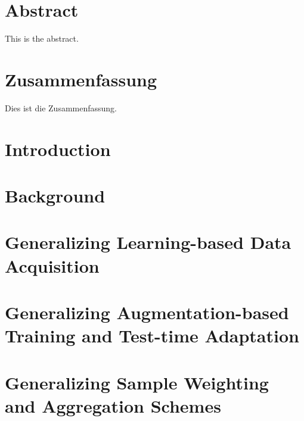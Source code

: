 \documentclass[11pt, a4paper, oneside, headsepline, titlepage, DIV=11, BCOR=12mm, captions=tableheading, chapterprefix=on, numbers=noenddot]{scrbook}
\begin{document}
    \thispagestyle{headings}
    

    \enlargethispage{1\baselineskip}
    \setcounter{page}{1}

    \chapter*{Abstract} %
        This is the abstract.
    \cleardoublepage

    \chapter*{Zusammenfassung} %
        Dies ist die Zusammenfassung.
    \cleardoublepage

    \tableofcontents
    \cleardoublepage

    \chapter{Introduction} %
        \label{chap:introduction}
        

    \chapter{Background} %
        \label{chap:background}
        

    \chapter{Generalizing Learning-based Data Acquisition}
        \label{chap:acquisitionfocus}

    \chapter{Generalizing Augmentation-based Training and Test-time Adaptation}
        \label{chap:dgtta}

    \chapter{Generalizing Sample Weighting and Aggregation Schemes}
        \label{chap:deepstaple}
\end{document}
